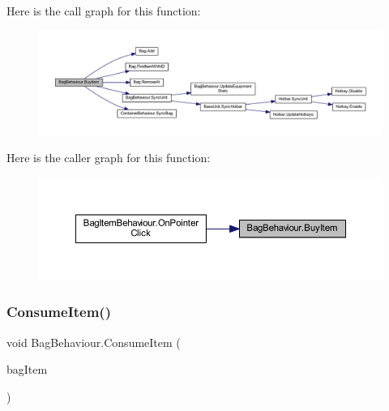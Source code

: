Here is the call graph for this function\+:
\nopagebreak
\begin{figure}[H]
\begin{center}
\leavevmode
\includegraphics[width=350pt]{class_bag_behaviour_a22439e4f35b9173c64d16c2534c4b388_cgraph}
\end{center}
\end{figure}
Here is the caller graph for this function\+:
\nopagebreak
\begin{figure}[H]
\begin{center}
\leavevmode
\includegraphics[width=350pt]{class_bag_behaviour_a22439e4f35b9173c64d16c2534c4b388_icgraph}
\end{center}
\end{figure}
\mbox{\label{class_bag_behaviour_a407231bcd34e96129c9ae624a484a045}} 
\subsubsection{\texorpdfstring{ConsumeItem()}{ConsumeItem()}}
{\footnotesize\ttfamily void Bag\+Behaviour.\+Consume\+Item (\begin{DoxyParamCaption}\item[{\mbox{\hyperlink{class_bag_item_behaviour}{Bag\+Item\+Behaviour}}}]{bag\+Item }\end{DoxyParamCaption})}


